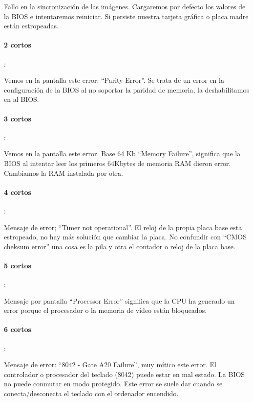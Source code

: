 \documentclass[12pt,oneside,a4paper]{article}
\begin{document}
			Fallo en la sincronización de las imágenes. Cargaremos por defecto los
			valores de la BIOS e intentaremos reiniciar. Si persiste nuestra
			tarjeta gráfica o placa madre están estropeadas. 

			\paragraph{2 cortos}:
			
			Vemos en la pantalla este error: “Parity Error”. Se trata de un error
			en la configuración de la BIOS al no soportar la paridad de memoria, la
			deshabilitamos en al BIOS. 

			\paragraph{3 cortos}:
			
			Vemos en la pantalla este error. Base 64 Kb “Memory Failure”, significa
			que la BIOS al intentar leer los primeros 64Kbytes de memoria RAM
			dieron error. Cambiamos la RAM instalada por otra. 

			\paragraph{4 cortos}:
			
			Mensaje de error; “Timer not operational”. El reloj de la propia placa
			base esta estropeado, no hay más solución que cambiar la placa. No
			confundir con “CMOS cheksum error” una cosa es la pila y otra el
			contador o reloj de la placa base. 

			\paragraph{5 cortos}:
			
			Mensaje por pantalla ``Processor Error'' significa que la CPU ha generado
			un error porque el procesador o la memoria de vídeo están bloqueados. 

			\paragraph{6 cortos}:

			Mensaje de error: ``8042 - Gate A20 Failure'', muy mítico este error.
			El controlador o procesador del teclado (8042) puede estar en mal
			estado. 
			La BIOS no puede conmutar en modo protegido. Este error se
			suele dar cuando se conecta/desconecta el teclado con el ordenador
			encendido. 
\end{document}

